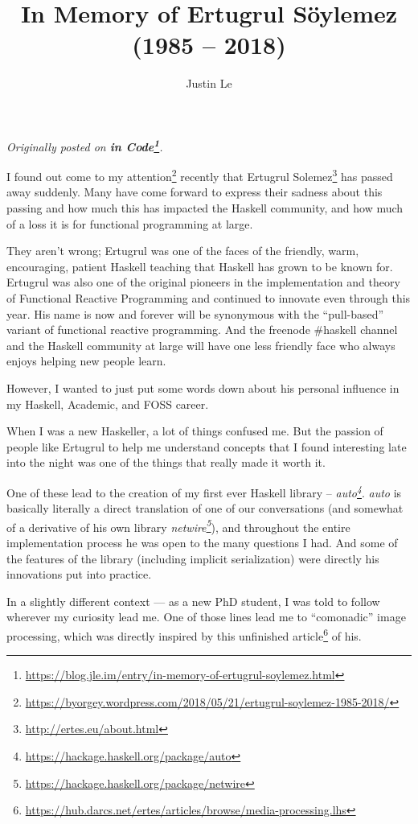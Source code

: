 \documentclass[]{article}
\title{In Memory of Ertugrul Söylemez (1985 -- 2018)}
\author{Justin Le}
\renewcommand{\href}[2]{#2\footnote{\url{#1}}}
\begin{document}
\maketitle

\emph{Originally posted on
\textbf{\href{https://blog.jle.im/entry/in-memory-of-ertugrul-soylemez.html}{in
Code}}.}

I found out
\href{https://byorgey.wordpress.com/2018/05/21/ertugrul-soylemez-1985-2018/}{come
to my attention} recently that \href{http://ertes.eu/about.html}{Ertugrul
Solemez} has passed away suddenly. Many have come forward to express their
sadness about this passing and how much this has impacted the Haskell community,
and how much of a loss it is for functional programming at large.

They aren't wrong; Ertugrul was one of the faces of the friendly, warm,
encouraging, patient Haskell teaching that Haskell has grown to be known for.
Ertugrul was also one of the original pioneers in the implementation and theory
of Functional Reactive Programming and continued to innovate even through this
year. His name is now and forever will be synonymous with the ``pull-based''
variant of functional reactive programming. And the freenode \#haskell channel
and the Haskell community at large will have one less friendly face who always
enjoys helping new people learn.

However, I wanted to just put some words down about his personal influence in my
Haskell, Academic, and FOSS career.

When I was a new Haskeller, a lot of things confused me. But the passion of
people like Ertugrul to help me understand concepts that I found interesting
late into the night was one of the things that really made it worth it.

One of these lead to the creation of my first ever Haskell library --
\emph{\href{https://hackage.haskell.org/package/auto}{auto}}. \emph{auto} is
basically literally a direct translation of one of our conversations (and
somewhat of a derivative of his own library
\emph{\href{https://hackage.haskell.org/package/netwire}{netwire}}), and
throughout the entire implementation process he was open to the many questions I
had. And some of the features of the library (including implicit serialization)
were directly his innovations put into practice.

In a slightly different context --- as a new PhD student, I was told to follow
wherever my curiosity lead me. One of those lines lead me to ``comonadic'' image
processing, which was directly inspired by
\href{https://hub.darcs.net/ertes/articles/browse/media-processing.lhs}{this
unfinished article} of his.
\end{document}
